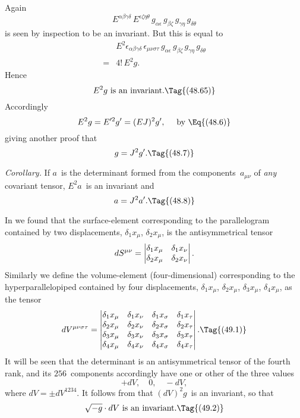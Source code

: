 \documentclass[12pt]{book}
\begin{document}
Again
\[
E^{\alpha\beta\gamma\delta}\, E^{\epsilon\zeta\eta\theta}\,
g_{\alpha\epsilon}\, g_{\beta\zeta}\, g_{\gamma\eta}\, g_{\delta\theta}
\]
is seen by inspection to be an invariant. But this is equal to
\begin{align*}
  &E^{2} \epsilon_{\alpha\beta\gamma\delta}\, \epsilon_{\mu\nu\sigma\tau}\,
  g_{\alpha\epsilon}\, g_{\beta\zeta}\, g_{\gamma\eta}\, g_{\delta\theta} \\
= {} &4!\, E^{2} g.
\end{align*}
Hence
\[
\text{$E^{2} g$ is an invariant.}
\Tag{(48.65)}
\]
Accordingly
\[
E^{2} g = E'^{2} g' = (EJ)^{2} g',\quad\text{ by \Eq{(48.6)}}
\]
giving another proof that
\[
g = J^{2} g'.
\Tag{(48.7)}
\]

\emph{Corollary.} If $a$~is the determinant formed from the components~$a_{\mu\nu}$ of
\emph{any} covariant tensor, $E^{2} a$~is an invariant and
\[
a = J^{2} a'.
\Tag{(48.8)}
\]


In  we found that the surface\hyp{}element corresponding to the parallelogram
contained by two displacements, $\delta_{1} x_{\mu}$, $\delta_{2} x_{\mu}$, is the antisymmetrical tensor
\[
dS^{\mu\nu} = \left|\begin{array}{@{}cc@{}}
\delta_{1} x_{\mu} & \delta_{1} x_{\nu} \\
\delta_{2} x_{\mu} & \delta_{2} x_{\nu} \\
\end{array}\right|.
\]
Similarly we define the volume\hyp{}element (four\hyp{}dimensional) corresponding to
%
the hyperparallelopiped contained by four displacements, $\delta_{1} x_{\mu}$, $\delta_{2} x_{\mu}$, $\delta_{3} x_{\mu}$, $\delta_{4} x_{\mu}$,
as the tensor
\[
dV^{\mu\nu\sigma\tau} = \left|\begin{array}{@{}cccc@{}}
\delta_{1} x_{\mu} & \delta_{1} x_{\nu} & \delta_{1} x_{\sigma} & \delta_{1} x_{\tau} \\
\delta_{2} x_{\mu} & \delta_{2} x_{\nu} & \delta_{2} x_{\sigma} & \delta_{2} x_{\tau} \\
\delta_{3} x_{\mu} & \delta_{3} x_{\nu} & \delta_{3} x_{\sigma} & \delta_{3} x_{\tau} \\
\delta_{4} x_{\mu} & \delta_{4} x_{\nu} & \delta_{4} x_{\sigma} & \delta_{4} x_{\tau} \\
\end{array}\right|.
\Tag{(49.1)}
\]
It will be seen that the determinant is an antisymmetrical tensor of the fourth
rank, and its $256$~components accordingly have one or other of the three values
\[
+dV,\quad 0,\quad -dV,
\]
where $dV = \pm dV^{1234}$. It follows from  that $(dV)^{2} g$~is an invariant, so
that
\[
\text{$\sqrt{-g} \cdot dV$ is an invariant.}
\Tag{(49.2)}
\]
\end{document}
